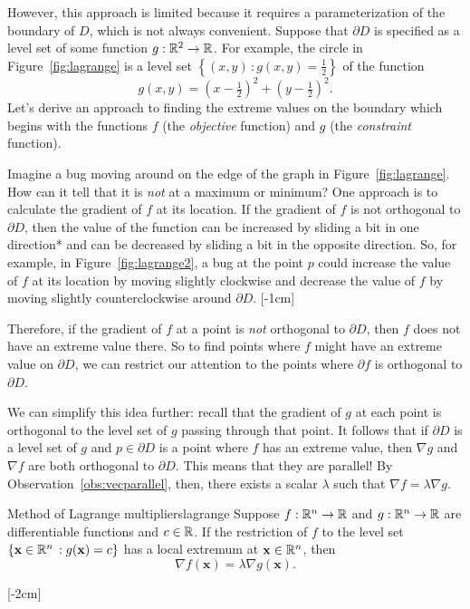 \documentclass{watsonbook}
\begin{document}
  However, this approach is limited because it requires a
  parameterization of the boundary of $D$, which is not always
  convenient. Suppose that $\partial D$ is specified as a level set of
  some function $g: \mathbb{R}^2 \to \mathbb{R}$. For example, the
  circle in Figure~\ref{fig:lagrange} is a level set $\left\{(x,y) \, :
  g(x,y) = \tfrac{1}{2}\right\}$ of the function
  \[
    g(x,y) = \left(x-\tfrac{1}{2}\right)^2 + \left(y-\tfrac{1}{2}\right)^2. 
  \]
  Let's derive an approach to finding the extreme values on the
  boundary which begins with the functions $f$ (the \textit{objective}
  function) and $g$ (the \textit{constraint} function).

  
  Imagine a bug moving around on the edge of the graph in
  Figure~\ref{fig:lagrange}. How can it tell that it is \textit{not}
  at a maximum or minimum? One approach is to calculate the gradient
  of $f$ at its location. If the gradient of $f$ is not orthogonal to
  $\partial D$, then the value of the function can be increased by
  sliding a bit in one direction* and can be decreased by sliding a
  bit in the opposite direction. So, for example, in
  Figure~\ref{fig:lagrange2}, a bug at the point $p$ could increase
  the value of $f$ at its location by moving slightly clockwise and
  decrease the value of $f$ by moving slightly counterclockwise around
  $\partial D$. [-1cm]

  Therefore, if the gradient of $f$ at a point is \textit{not}
  orthogonal to $\partial D$, then $f$ does not have an extreme
  value there. So to find points where $f$ might have an extreme value
  on $\partial D$, we can restrict our attention to the points where
  $\partial f$ is orthogonal to $\partial D$.

  We can simplify this idea further: recall that the gradient of $g$
  at each point is orthogonal to the level set of $g$ passing through
  that point. It follows that if $\partial D$ is a level set of $g$
  and $p \in \partial D$ is a point where $f$ has an extreme value,
  then $\nabla g$ and $\nabla f$ are both orthogonal to $\partial
  D$. This means that they are parallel! By
  Observation~\ref{obs:vecparallel}, then, there exists a scalar
  $\lambda$ such that $\nabla f = \lambda \nabla g$.

  \begin{theo}{Method of Lagrange multipliers}{lagrange}
    Suppose $f: \mathbb{R}^n \to \mathbb{R}$ and $g:\mathbb{R}^n \to \mathbb{R}$ are differentiable
    functions and $c \in \mathbb{R}$. If the restriction of $f$ to the level
    set $\{\mathbf{x} \in \mathbb{R}^n \,: g(\mathbf{x}) = c\}$ has a local
    extremum at $\mathbf{x} \in \mathbb{R}^n$, then
    \[
      \nabla f (\mathbf{x}) = \lambda \nabla g (\mathbf{x}). 
    \]
  \end{theo} [-2cm]
\end{document}
